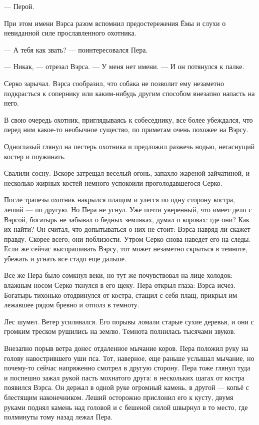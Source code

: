 \documentclass[12pt, a4paper, openany]{book}
\begin{document}
	— Перой.
	
	При этом имени Вэрса разом вспомнил предостережения Ёмы и слухи о невиданной силе прославленного охотника.
	
	— А тебя как звать? — поинтересовался Пера.
	
	— Никак, — отрезал Вэрса. — У меня нет имени. — И он потянулся к палке.
	
	Серко зарычал. Вэрса сообразил, что собака не позволит ему незаметно подкрасться к сопернику или каким-нибудь другим способом внезапно напасть на него.
	
	В свою очередь охотник, приглядываясь к собеседнику, все более убеждался, что перед ним какое-то необычное существо, по приметам очень похожее на Вэрсу.
	
	Одноглазый глянул на пестерь охотника и предложил разжечь нодью, негаснущий костер и поужинать.
	
	Свалили сосну. Вскоре затрещал веселый огонь, запахло жареной зайчатиной, и несколько жирных костей немного успокоили проголодавшегося Серко.
	
	После трапезы охотник накрылся плащом и улегся по одну сторону костра, леший — по другую. Но Пера не уснул. Уже почти уверенный, что имеет дело с Вэрсой, богатырь не забывал о бедных земляках, думал о коровах: где они? Как их найти? Он считал, что допытываться о них не стоит: Вэрса навряд ли скажет правду. Скорее всего, они поблизости. Утром Серко снова наведет его на следы. Если же сейчас выспрашивать Вэрсу, тот может незаметно скрыться в темноте, убежать и угнать все стадо еще дальше.
	
	Все же Пера было сомкнул веки, но тут же почувствовал на лице холодок: влажным носом Серко ткнулся в его щеку. Пера открыл глаза: Вэрса исчез. Богатырь тихонько отодвинулся от костра, стащил с себя плащ, прикрыл им лежавшее рядом бревно и отполз в темноту.
	
	Лес шумел. Ветер усиливался. Его порывы ломали старые сухие деревья, и они с громким треском рушились на землю. Темнота полнилась тысячами звуков.
	
	Внезапно порыв ветра донес отдаленное мычание коров. Пера положил руку на голову навострившего уши пса. Тот, наверное, еще раньше услышал мычание, но почему-то сейчас напряженно смотрел в другую сторону. Пера тоже глянул туда и поспешно зажал рукой пасть мохнатого друга: в нескольких шагах от костра появился Вэрса. Он держал в одной руке огромный камень, в другой — копьё с блестящим наконечником. Леший осторожно прислонил его к кусту, двумя руками поднял камень над головой и с бешеной силой швырнул в то место, где полминуты тому назад лежал Пера.
	
\end{document}
